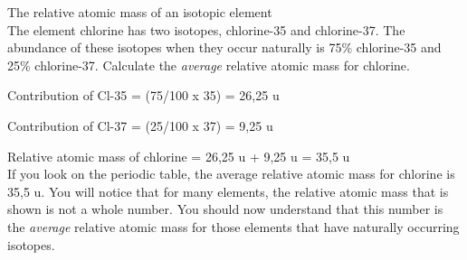       
\begin{wex}{The relative atomic mass of an isotopic element\\}{
The element chlorine has two isotopes, chlorine-35 and chlorine-37. The abundance of these isotopes when they occur naturally is 75\% chlorine-35 and 25\% chlorine-37. Calculate the \textit{average} relative atomic mass for chlorine.\\
}

{

Contribution of Cl-35 = (75/100 x 35) = 26,25 u\\
}
{

Contribution of Cl-37 = (25/100 x 37) = 9,25 u\\
}

{

Relative atomic mass of chlorine = 26,25 u + 9,25 u = 35,5 u \\

If you look on the periodic table, the average relative atomic mass for chlorine is 35,5 u. You will notice that for many elements, the relative atomic mass that is shown is not a whole number. You should now understand that this number is the \textit{average} relative atomic mass for those elements that have naturally occurring isotopes.}
\end{wex}


